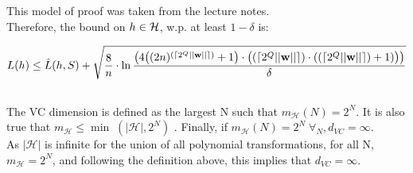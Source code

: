 \documentclass{scrartcl}
\begin{document}
This model of proof was taken from the lecture notes. \cite[p. 19]{mln} \\

Therefore, the bound on $h \in {\mathcal{H}}$, w.p. at least $ 1 - \delta$ is:

\[
    L(h) \leq \hat{L} (h, S) +
    \sqrt {
        \frac {8} {n} \cdot \ln
        \frac { \big(
        4 \big(
            ( 2n )^{(\lceil 2^Q || {\mathbf w} ||\rceil)} + 1
        \big)
        \cdot
        \big( {(\lceil 2^Q || {\mathbf w} ||\rceil)} \cdot ({(\lceil 2^Q || {\mathbf w} ||\rceil)} + 1) \big)
        \big) } {\delta}
    }
\]


\subsection{}

%
%
%

The VC dimension is defined as the largest N such that $m_\mathcal{H} (N) = 2^N.$
It is also true that $m_\mathcal{H} \leq \min \; (|\mathcal{H}|, 2^N)$
\cite[Home Assignment 5.2.1]{mla}. Finally, if $m_\mathcal{H} (N) = 2^N \; \forall_N, d_{VC} = \infty$. \cite[def. 2.5, p.50]{abu}\\

As $|\mathcal{H}|$ is infinite for the union of all polynomial transformations, for all N, $m_\mathcal{H} = 2^N$, and following the definition above, this implies that $d_{VC} = \infty$.

\subsection{}

\newpage
\printbibliography
\end{document}
